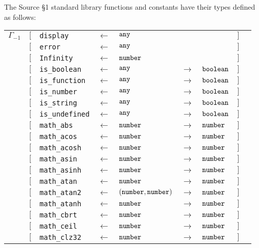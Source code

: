 The Source \S 1 standard library functions and constants have their types defined as follows:

\begin{tabular}[fragile]{lllllllll}
$\Gamma_{-1}$
& $[$ & \texttt{display}      & $\leftarrow$  & $\texttt{any}$ & & & $]$ \\
& $[$ & \texttt{error}      & $\leftarrow$  & $\texttt{any}$ & & & $]$ \\
& $[$ & \texttt{Infinity}      & $\leftarrow$  & $\texttt{number}$ & & & $]$ \\
& $[$ & \texttt{is\_boolean}   & $\leftarrow$  & $\texttt{any}$ & $\rightarrow$ & $\texttt{boolean}$ & $]$ \\
& $[$ & \texttt{is\_function}  & $\leftarrow$  & $\texttt{any}$ & $\rightarrow$ & $\texttt{boolean}$ & $]$ \\
& $[$ & \texttt{is\_number}    & $\leftarrow$  & $\texttt{any}$ & $\rightarrow$ & $\texttt{boolean}$ & $]$ \\
& $[$ & \texttt{is\_string}    & $\leftarrow$  & $\texttt{any}$ & $\rightarrow$ & $\texttt{boolean}$ & $]$ \\
& $[$ & \texttt{is\_undefined} & $\leftarrow$  & $\texttt{any}$ & $\rightarrow$ & $\texttt{boolean}$ & $]$ \\
& $[$ & \texttt{math\_abs} & $\leftarrow$  & $\texttt{number}$ & $\rightarrow$ & $\texttt{number}$ & $]$ \\
& $[$ & \texttt{math\_acos} & $\leftarrow$  & $\texttt{number}$ & $\rightarrow$ & $\texttt{number}$ & $]$ \\
& $[$ & \texttt{math\_acosh} & $\leftarrow$  & $\texttt{number}$ & $\rightarrow$ & $\texttt{number}$ & $]$ \\
& $[$ & \texttt{math\_asin} & $\leftarrow$  & $\texttt{number}$ & $\rightarrow$ & $\texttt{number}$ & $]$ \\
& $[$ & \texttt{math\_asinh} & $\leftarrow$  & $\texttt{number}$ & $\rightarrow$ & $\texttt{number}$ & $]$ \\
& $[$ & \texttt{math\_atan} & $\leftarrow$  & $\texttt{number}$ & $\rightarrow$ & $\texttt{number}$ & $]$ \\
& $[$ & \texttt{math\_atan2} & $\leftarrow$  & $(\texttt{number}, \texttt{number})$ & $\rightarrow$ & $\texttt{number}$ & $]$ \\
& $[$ & \texttt{math\_atanh} & $\leftarrow$  & $\texttt{number}$ & $\rightarrow$ & $\texttt{number}$ & $]$ \\
& $[$ & \texttt{math\_cbrt} & $\leftarrow$  & $\texttt{number}$ & $\rightarrow$ & $\texttt{number}$ & $]$ \\
& $[$ & \texttt{math\_ceil} & $\leftarrow$  & $\texttt{number}$ & $\rightarrow$ & $\texttt{number}$ & $]$ \\
& $[$ & \texttt{math\_clz32} & $\leftarrow$  & $\texttt{number}$ & $\rightarrow$ & $\texttt{number}$ & $]$ \\

\end{tabular}
